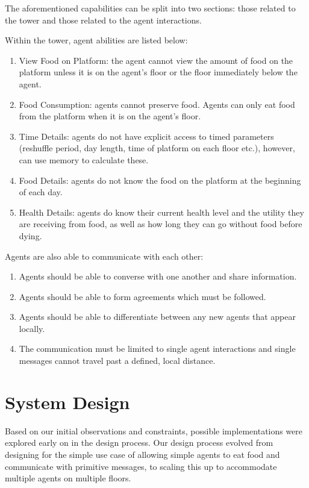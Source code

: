 The aforementioned capabilities can be split into two sections: those related to the tower and those related to the agent interactions.
 
Within the tower, agent abilities are listed below:
\begin{enumerate}
    \item View Food on Platform: the agent cannot view the amount of food on the platform unless it is on the agent’s floor or the floor immediately below the agent.
    \item Food Consumption: agents cannot preserve food. Agents can only eat food from the platform when it is on the agent's floor.
    \item Time Details: agents do not have explicit access to timed parameters (reshuffle period, day length, time of platform on each floor etc.), however, can use memory to calculate these.
    \item Food Details: agents do not know the food on the platform at the beginning of each day.

    \item Health Details: agents do know their current health level and the utility they are receiving from food, as well as how long they can go without food before dying.
    
\end{enumerate}

Agents are also able to communicate with each other:
\begin{enumerate}
    \item Agents should be able to converse with one another and share information.
    \item Agents should be able to form agreements which must be followed.
    \item Agents should be able to differentiate between any new agents that appear locally.
    \item The communication must be limited to single agent interactions and single messages cannot travel past a defined, local distance. 
\end{enumerate}

\section{System Design}\label{system_design}

Based on our initial observations and constraints, possible implementations were explored early on in the design process. Our design process evolved from designing for the simple use case of allowing simple agents to eat food and communicate with primitive messages, to scaling this up to accommodate multiple agents on multiple floors.

